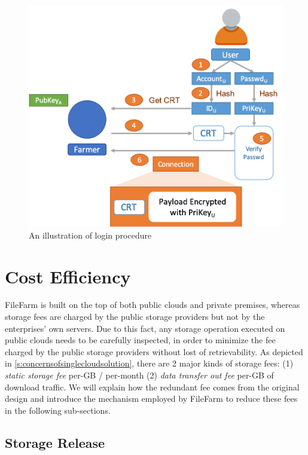 \begin{figure}[!b]
  \centering
    \includegraphics[width=12cm]{figures/access_management_login.png}
    \caption{An illustration of login procedure}
    \label{fig:accessmanagementlogin}
\end{figure}

\newpage\phantom{blabla}
\newpage\phantom{blabla}

\section{Cost Efficiency}
\label{s:costefficiency}

FileFarm is built on the top of both public clouds and private premises, whereas storage fees are charged by the public storage providers but not by the enterprises' own servers. Due to this fact, any storage operation executed on public clouds needs to be carefully inspected, in order to minimize the fee charged by the public storage providers without lost of retrievability. As depicted in \ref{s:concernsofsinglecloudsolution}, there are 2 major kinds of storage fees: (1) \textit{static storage fee} per-GB / per-month (2) \textit{data transfer out fee} per-GB of download traffic. We will explain how the redundant fee comes from the original design and introduce the mechanism employed by FileFarm to reduce these fees in the following sub-sections.

\subsection{Storage Release}
\label{ss:storagerelease}

